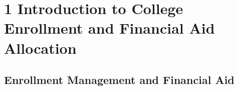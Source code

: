 \documentclass[12pt,english]{report}
\begin{document}

\newpage
\setcounter{page}{1}

\chapter{1    Introduction to College Enrollment and Financial Aid Allocation}

\section{Enrollment Management and Financial Aid}
\end{document}
